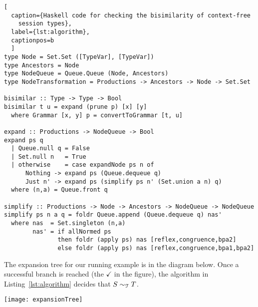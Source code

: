 \begin{lstlisting}[
  caption={Haskell code for checking the bisimilarity of context-free
    session types},
  label={lst:algorithm},
  captionpos=b
  ]
type Node = Set.Set ([TypeVar], [TypeVar])
type Ancestors = Node
type NodeQueue = Queue.Queue (Node, Ancestors)
type NodeTransformation = Productions -> Ancestors -> Node -> Set.Set

bisimilar :: Type -> Type -> Bool
bisimilar t u = expand (prune p) [x] [y]
  where Grammar [x, y] p = convertToGrammar [t, u]

expand :: Productions -> NodeQueue -> Bool
expand ps q
  | Queue.null q = False 
  | Set.null n   = True
  | otherwise    = case expandNode ps n of
      Nothing -> expand ps (Queue.dequeue q)
      Just n' -> expand ps (simplify ps n' (Set.union a n) q)
  where (n,a) = Queue.front q

simplify :: Productions -> Node -> Ancestors -> NodeQueue -> NodeQueue
simplify ps n a q = foldr Queue.append (Queue.dequeue q) nas'
  where nas  = Set.singleton (n,a)
        nas' = if allNormed ps
               then foldr (apply ps) nas [reflex,congruence,bpa2]
               else foldr (apply ps) nas [reflex,congruence,bpa1,bpa2]
\end{lstlisting}

\begin{example}
  The expansion tree for our running example is
  in the diagram below. Once a successful
  branch is reached (the $\checkmark$ in the figure), the algorithm in
  Listing~\ref{lst:algorithm} decides that $S\sim_\mathcal T T$.
\end{example}

\begin{center}
	\texttt{[image: expansionTree]}
\end{center}

